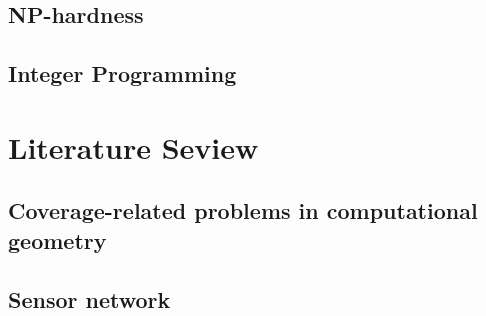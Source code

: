 \subsection{NP-hardness}
\subsection{Integer Programming}
\subsection{}
\section{Literature Seview} 
\subsection{Coverage-related problems in computational geometry} 

\subsection{Sensor network} 

\subsection{}
